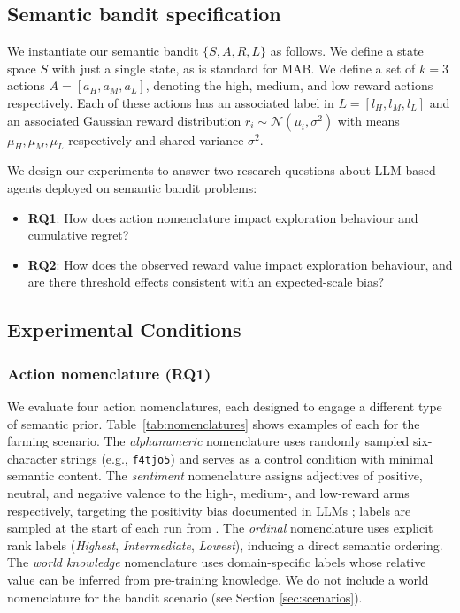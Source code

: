 \documentclass{article} %
\begin{document}
\subsection{Semantic bandit specification}
\label{sec:semantic_bandit}
We instantiate our semantic bandit $ \{S,A,R,L\} $ as follows. We define a state space $S$ with just a single state, as is standard for MAB. We define a set of $k=3$ actions $A = [a_{H}, a_{M}, a_{L}]$, denoting the high, medium, and low reward actions respectively. Each of these actions has an associated label in $L = [l_H,l_M,l_L]$ and an associated Gaussian reward distribution $r_i \sim \mathcal{N}(\mu_i, \sigma^2)$ with means $\mu_H,\mu_M,\mu_L$ respectively and shared variance $\sigma^2$. 

We design our experiments to answer two research questions about LLM-based agents deployed on semantic bandit problems:

\begin{itemize}
    \item \textbf{RQ1}: How does action nomenclature impact exploration behaviour and
    cumulative regret?
    \item \textbf{RQ2}: How does the observed reward value impact exploration behaviour,
    and are there threshold effects consistent with an expected-scale bias?
\end{itemize}

\subsection{Experimental Conditions}

\subsubsection{Action nomenclature (RQ1)}
\label{sec:nomenclature}

We evaluate four action nomenclatures, each designed to engage a different
type of semantic prior. Table~\ref{tab:nomenclatures} shows examples of each for the farming scenario. The \textit{alphanumeric} nomenclature uses randomly sampled six-character strings (e.g., \texttt{f4tjo5}) and serves as a control condition with minimal semantic content. The \textit{sentiment} nomenclature assigns adjectives of positive, neutral, and negative valence to the high-, medium-, and low-reward arms respectively, targeting the positivity bias documented in LLMs \citep{sharma2024towards}; labels are sampled at the start of each run from \citet{taboada-etal-2011-lexicon}. The \textit{ordinal} nomenclature uses explicit rank labels (\textit{Highest}, \textit{Intermediate}, \textit{Lowest}), inducing a direct semantic ordering. The \textit{world knowledge} nomenclature uses domain-specific labels whose relative value can be inferred from pre-training knowledge. We do not include a world nomenclature for the bandit scenario (see Section \ref{sec:scenarios}).
\end{document}
